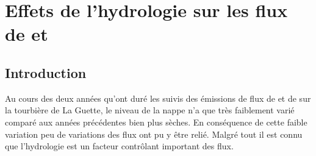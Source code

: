 \chapter{Effets de l'hydrologie sur les flux de \coo et \chh}

\minitoc

\newpage

\section{Introduction}

Au cours des deux années qu'ont duré les suivis des émissions de flux de \coo et de \chh sur la tourbière de La Guette, le niveau de la nappe n'a que très faiblement varié comparé aux années précédentes bien plus sèches.
En conséquence de cette faible variation peu de variations des flux ont pu y être relié.
Malgré tout il est connu que l'hydrologie est un facteur contrôlant important des flux.


